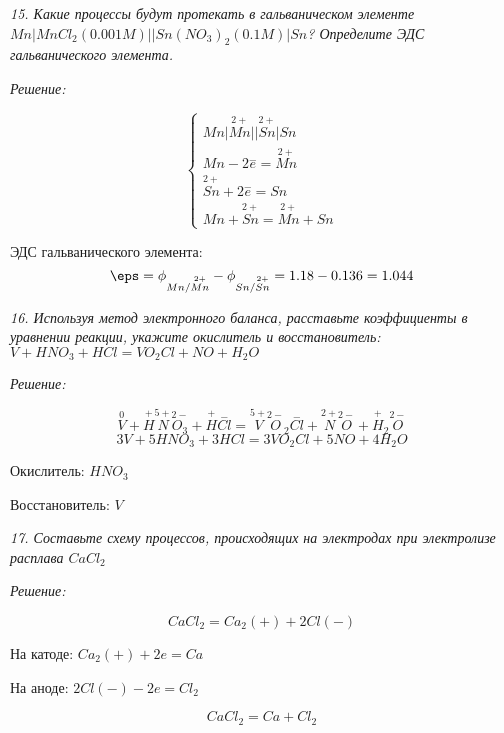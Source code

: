 \pagebreak

\emph{15. Какие процессы будут протекать в гальваническом элементе \\
\( Mn \vert MnCl_2(0.001 M) \vert\vert Sn(NO_3)_2(0.1 M) \vert Sn \)? 
Определите ЭДС гальванического элемента.}

\emph{Решение:}

\[
	\left\{ \begin{array}{ll}
		Mn \vert \stackrel{2+}{Mn} \vert\vert \stackrel{2+}{Sn} \vert Sn \\
		Mn - 2\stackrel{-}{e} = \stackrel{2+}{Mn} \\
		\stackrel{2+}{Sn} + 2\stackrel{-}{e} = Sn \\
		Mn + \stackrel{2+}{Sn} = \stackrel{2+}{Mn} + Sn 
	\end{array} \right.
\]

ЭДС гальванического элемента:
\[
	\eps = \phi_{Mn/\stackrel{2+}{Mn}} - \phi_{Sn/\stackrel{2+}{Sn}} = 
	1.18 - 0.136 = 1.044
\]

\pagebreak

\emph{16. Используя метод электронного баланса, расставьте коэффициенты 
в уравнении реакции, укажите окислитель и восстановитель:
\( V + HNO_3 + HCl = VO_2 Cl + NO + H_2 O \) }

\emph{Решение:}

\[ 
	\stackrel{0}{V} + \stackrel{+}{H}\stackrel{5+}{N}\stackrel{2-}{O_3} + 
	\stackrel{+}{H}\stackrel{-}{Cl} = \stackrel{5+}{V}\stackrel{2-}{O}_2
	\stackrel{-}{Cl} + \stackrel{2+}{N}\stackrel{2-}{O} + 
	\stackrel{+}{H}_2\stackrel{2-}{O} 
\]
\[ 3V + 5HNO_3 + 3HCl = 3VO_2 Cl + 5NO + 4H_2 O \]

Окислитель: \( HNO_3 \)

Восстановитель: \( V \) \\ 

\pagebreak

\emph{17. Составьте схему процессов, происходящих на электродах при 
электролизе расплава \( CaCl_2 \)}

\emph{Решение:}

\[
	CaCl_2 = Ca_2(+) + 2Cl(-)
\]

На катоде: \( Ca_2(+) + 2e = Ca \)

На аноде: \( 2Cl(-) - 2e = Cl_2 \)

\[
	CaCl_2 = Ca + Cl_2 
\]

